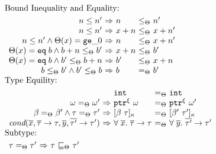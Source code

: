 \begin{DIFnomarkup}
\begin{figure}
{\small
\[\hspace*{-1.2em}
\begin{array}{l}
\text{Bound Inequality and Equality:}\\[0.3em]
  \begin{array}{r@{~}c@{~}l@{~}c@{~}l}
     n \le n' &\Rightarrow& n &\le_{\Theta} & n'\\
     n \le n' &\Rightarrow& x+n &\le_{\Theta} & x+n'\\
     n \le n' \wedge \Theta(x)=\tgez &\Rightarrow& n &\le_{\Theta} & x+n'\\
     \Theta(x)=\teq{b} \wedge b+n\le_{\Theta}b'  &\Rightarrow& x+n & \le_{\Theta} & b'\\
     \Theta(x)=\teq{b}\wedge b'\le_{\Theta}b+n  &\Rightarrow& b' & \le_{\Theta} & x+n\\
     b \le_{\Theta} b' \wedge b' \le_{\Theta} b  &\Rightarrow& b & =_{\Theta} & b'
    \end{array}
  \\[0.7em]
\text{Type Equility:}\\[0.3em]
  \begin{array}{r@{~}c@{~}l@{~}c@{~}l}
     && \tint & =_{\Theta} & \tint\\
     \omega =_{\Theta} \omega' &\Rightarrow& \tptr{\omega}{\xi} & =_{\Theta} & \tptr{\omega'}{\xi}\\
     \bvar =_{\Theta} \bvar' \wedge  \tau =_{\Theta} \tau'
             &\Rightarrow& \tallarrayb{\bvar}{\tau} & =_{\Theta} & \tallarrayb{\bvar'}{\tau'}\\

    \textit{cond}(\overline{x},\overline{\tau}\to\tau,\overline{y},\overline{\tau'}\to\tau')

 &\Rightarrow& \tfun{\overline{x}}{\overline{\tau}}{\tau} & 
                         =_{\Theta} & \tfun{\overline{y}}{\overline{\tau'}}{\tau'}\\
    \end{array}
  \\[0.7em]
\text{Subtype:}\\[0.3em]

  \begin{array}{r@{~}c@{~}l@{~}c@{~}l}
    \tau =_{\Theta} \tau'&\Rightarrow&\tau &\sqsubseteq_{\Theta}& \tau'\\[0.2em]


\end{array}
\end{array}\]}
\end{figure}
\end{DIFnomarkup}
